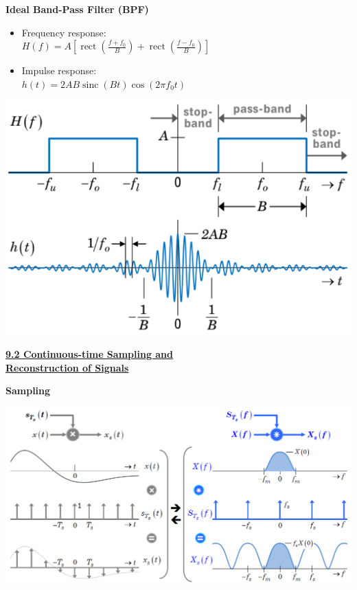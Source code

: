\documentclass[landscape,a4paper]{extarticle}
\newenvironment{Figure}
  {\par\medskip\noindent\minipage{\linewidth}}
  {\endminipage\par\medskip}
\newcommand{\rect}[1]{\operatorname{rect}\left(#1\right)}
\newcommand{\sinc}[1]{\operatorname{sinc}\left(#1\right)}
\begin{document}
\begin{multicols*}{5}
    \textbf{Ideal Band-Pass Filter (BPF)}
    \begin{itemize}
        \item Frequency response:\\
        $H(f) = A \left[\rect{\frac{f + f_0}{B}} + \rect{\frac{f - f_0}{B}}\right]$
        \item Impulse response:\\
        $h(t)=2AB\sinc{Bt}\cos{(2\pi f_0t)}$
    \end{itemize}

    \begin{Figure}
        \centering
        \includegraphics[width=\linewidth]{idealBPF.png}
    \end{Figure}

    \textbf{\uline{9.2 Continuous-time Sampling and\\Reconstruction of Signals}}

    \textbf{Sampling}

    \begin{Figure}
        \centering
        \includegraphics[width=\linewidth]{continuousTimeSampling.png}        
    \end{Figure}


\end{multicols*}
\end{document}
